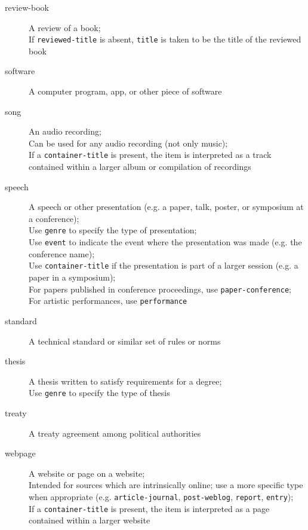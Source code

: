 \begin{description}
  \item[review-book]
    A review of a book;\\
    If \texttt{reviewed-title} is absent, \texttt{title} is taken to be the
    title of the reviewed book

  \item[software]
    A computer program, app, or other piece of software

  \item[song]
    An audio recording;\\
    Can be used for any audio recording (not only music);\\
    If a \texttt{container-title} is present, the item is interpreted as a
    track contained within a larger album or compilation of recordings

  \item[speech]
    A speech or other presentation (e.g. a paper, talk, poster, or symposium
    at a conference);\\
    Use \texttt{genre} to specify the type of presentation;\\
    Use \texttt{event} to indicate the event where the presentation was made
    (e.g. the conference name);\\
    Use \texttt{container-title} if the presentation is part of a larger
    session (e.g. a paper in a symposium);\\
    For papers published in conference proceedings, use
    \texttt{paper-conference};\\
    For artistic performances, use \texttt{performance}

  \item[standard]
    A technical standard or similar set of rules or norms

  \item[thesis]
    A thesis written to satisfy requirements for a degree;\\
    Use \texttt{genre} to specify the type of thesis

  \item[treaty]
    A treaty agreement among political authorities

  \item[webpage]
    A website or page on a website;\\
    Intended for sources which are intrinsically online; use a more specific
    type when appropriate (e.g. \texttt{article-journal},
    \texttt{post-weblog}, \texttt{report}, \texttt{entry});\\
    If a \texttt{container-title} is present, the item is interpreted as a
    page contained within a larger website

\end{description}

